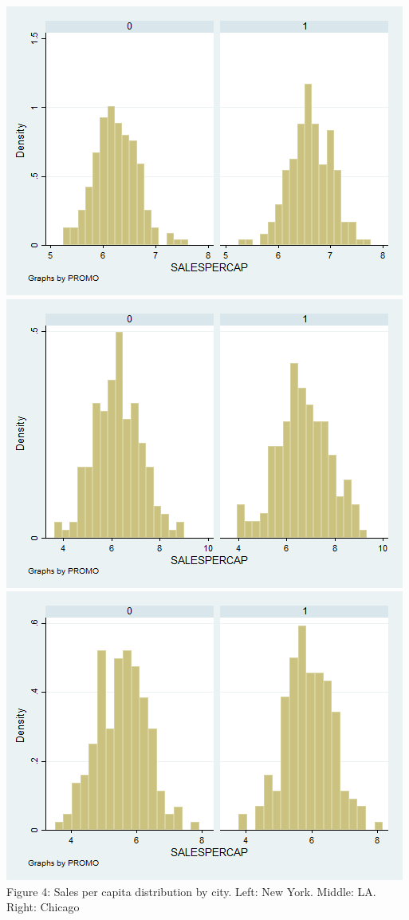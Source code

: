 \documentclass[10pt]{article}
\begin{document}
\begin{center}
  \includegraphics[scale=0.28]{g7_ny.png}
 \includegraphics[scale=0.28]{g8_la.png}
\includegraphics[scale=0.28]{g9_chi.png}\\
Figure 4: Sales per capita distribution by city. Left: New York. Middle: LA. Right: Chicago
\end{center}
\end{document}

